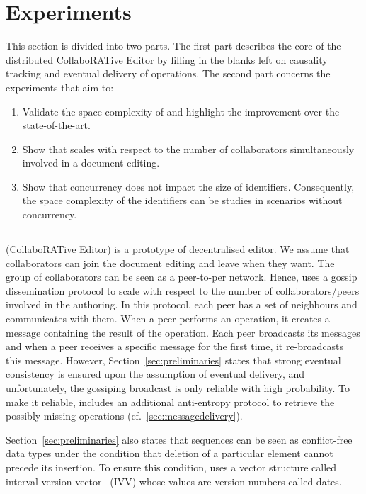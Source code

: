 \section{Experiments}
\label{sec:experiments}

This section is divided into two parts. The first part describes the core of
the distributed CollaboRATive Editor \CRATE by filling in the blanks
left on causality tracking and eventual delivery of operations. The second part
concerns the experiments that aim to:

\begin{enumerate}[leftmargin=*]
\item Validate the space complexity of \LSEQ and highlight the improvement
  over the state-of-the-art.
\item Show that \CRATE scales with respect to the number of
  collaborators simultaneously involved in a document editing.
\item Show that concurrency does not impact the size of
  identifiers. Consequently, the space complexity of the identifiers can be
  studies in scenarios without concurrency.
\end{enumerate}

\subsection{\CRATE}
\label{subsec:crdt}
\CRATE (CollaboRATive Editor) is a prototype of decentralised editor. We
assume that collaborators can join the document editing and leave when they
want. The group of collaborators can be seen as a peer-to-per network. Hence,
\CRATE uses a gossip dissemination protocol to scale with respect to the
number of collaborators/peers involved in the authoring. In this protocol, each
peer has a set of neighbours and communicates with them. When a peer performs
an operation, it creates a message containing the result of the operation. Each
peer broadcasts its messages and when a peer receives a specific message for
the first time, it re-broadcasts this message. However,
Section~\ref{sec:preliminaries} states that strong eventual consistency is
ensured upon the assumption of eventual delivery, and unfortunately, the
gossiping broadcast is only reliable with high probability. To make it
reliable, \CRATE includes an additional anti-entropy protocol to
retrieve the possibly missing operations (cf.~\ref{sec:messagedelivery}).

Section~\ref{sec:preliminaries} also states that sequences can be seen as
conflict-free data types under the condition that deletion of a particular
element cannot precede its insertion. To ensure this condition, \CRATE
uses a vector structure called interval version
vector~\cite{mukund2014optimized} (IVV) whose values are version numbers called
dates.

